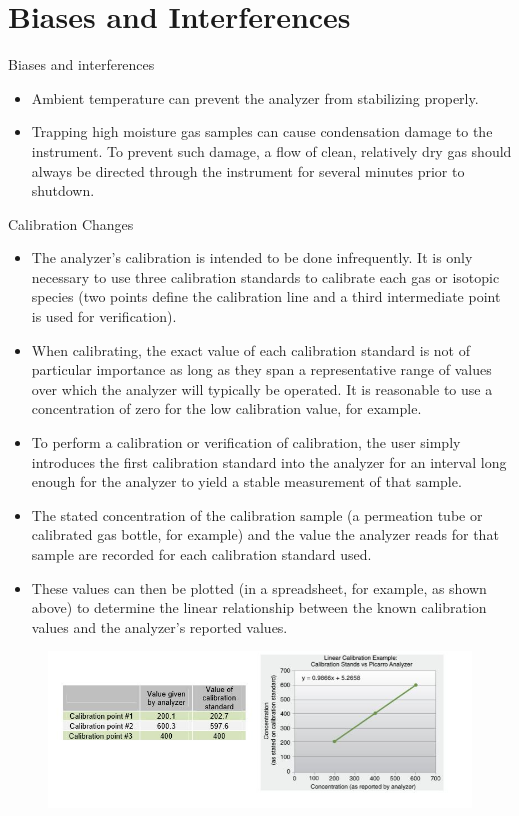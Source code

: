 \documentclass[12pt]{../SOP3}\usepackage[]{graphicx}\usepackage[]{color}
\begin{document}
\section{Biases and Interferences}

\NP Biases and interferences

\begin{itemize} 
  \item Ambient temperature can prevent the analyzer from stabilizing properly.

  \item Trapping high moisture gas samples can cause condensation damage to the instrument. To prevent such damage, a flow of clean, relatively dry gas should always be directed through the instrument for several minutes prior to shutdown. 


\end{itemize}

\NP Calibration Changes
\begin{itemize}
  \item The analyzer’s calibration is intended to be done infrequently. It is only necessary to use three calibration standards to calibrate each gas or isotopic species (two points define the calibration line and a third intermediate point is used for verification).

  \item When calibrating, the exact value of each calibration standard is not of particular importance as long as they span a representative range of values over which the analyzer will typically be operated. It is reasonable to use a concentration of zero for the low calibration value, for example. 
  \item To perform a calibration or verification of calibration, the user simply introduces the first calibration standard into the analyzer for an interval long enough for the analyzer to yield a stable measurement of that sample. 
  \item The stated concentration of the calibration sample (a permeation tube or calibrated gas bottle, for example) and the value the analyzer reads for that sample are recorded for each calibration standard used. 
  \item These values can then be plotted (in a spreadsheet, for example, as shown above) to determine the linear relationship between the known calibration values and the analyzer’s reported values.
\end{itemize}

\begin{figure}
\centering
  \includegraphics[width=1.0\textwidth]{"graphics/calibration"}
\end{figure}
\end{document}
